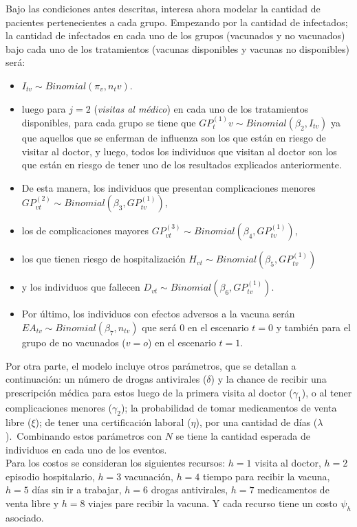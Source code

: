 \documentclass[12pt]{article}
\begin{document}
Bajo las condiciones antes descritas, interesa ahora modelar la cantidad de pacientes pertenecientes a cada grupo. Empezando por la cantidad de infectados; la cantidad de infectados en cada uno de los grupos (vacunados y no vacunados) bajo cada uno de los tratamientos (vacunas disponibles y vacunas no disponibles) será:\\
\begin{itemize}

\item $I_{tv} \sim Binomial(\pi_v,n_tv)$.
\item luego para $j=2$ (\textit{visitas al médico}) en cada uno de los tratamientos disponibles, para cada grupo se tiene que $GP^{(1)}_tv \sim Binomial(\beta_2,I_{tv})$ ya que aquellos que se enferman de influenza son los que están en riesgo de visitar al doctor, y luego, todos los individuos que visitan al doctor son los que están en riesgo de tener uno de los resultados explicados anteriormente.
\item De esta manera, los individuos que presentan complicaciones menores $GP^{(2)}_{vt} \sim Binomial(\beta_3,GP^{(1)}_{tv})$,
\item los de complicaciones mayores $GP^{(3)}_{vt} \sim Binomial(\beta_4,GP^{(1)}_{tv})$,
\item los que tienen riesgo de hospitalización $H_{vt} \sim Binomial(\beta_5,GP^{(1)}_{tv})$ 
\item y los individuos que fallecen $D_{vt} \sim Binomial(\beta_6,GP^{(1)}_{tv})$.
\item Por último, los individuos con efectos adversos a la vacuna serán $EA_{tv} \sim Binomial (\beta_7,n_{tv})$ que será 0 en el escenario $t=0$ y también para el grupo de no vacunados ($v=o$) en el escenario $t=1$.
\end{itemize}

Por otra parte, el modelo incluye otros parámetros, que se detallan a continuación: un número de drogas antivirales ($\delta$) y la chance de recibir una prescripción médica para estos luego de la primera visita al doctor ($\gamma_1$), o al tener complicaciones menores ($\gamma_2$); la probabilidad de tomar medicamentos de venta libre ($\xi$); de tener una certificación laboral ($\eta$), por una cantidad de días ($\lambda$).\
Combinando estos parámetros con $N$ se tiene la cantidad esperada de individuos en cada uno de los eventos.\\

Para los costos se consideran los siguientes recursos: $h=1$ visita al doctor, $h=2$ episodio hospitalario, $h=3$ vacunación, $h=4$ tiempo para recibir la vacuna, $h=5$ días sin ir a trabajar, $h=6$ drogas antivirales, $h=7$ medicamentos de venta libre y $h=8$ viajes pare recibir la vacuna. Y cada recurso tiene un costo $\psi_h$ asociado.\\
\end{document}
